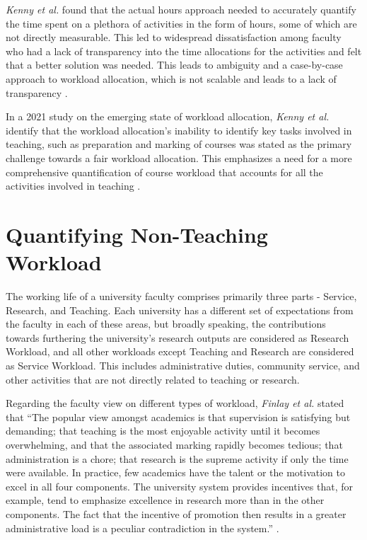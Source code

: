 \textit{Kenny et al.} found that the actual hours approach needed to accurately quantify the time spent on a plethora of activities in the form of hours, some of which are not directly measurable. This led to widespread dissatisfaction among faculty who had a lack of transparency into the time allocations for the activities and felt that a better solution was needed. This leads to ambiguity and a case-by-case approach to workload allocation, which is not scalable and leads to a lack of transparency \cite{kenny2014effectiveness}.

In a 2021 study on the emerging state of workload allocation, \textit{Kenny et al.} identify that the workload allocation's inability to identify key tasks involved in teaching, such as preparation and marking of courses was stated as the primary challenge towards a fair workload allocation. This emphasizes a need for a more comprehensive quantification of course workload that accounts for all the activities involved in teaching \cite{kenny2021emerging}.

\section{Quantifying Non-Teaching Workload}

The working life of a university faculty comprises primarily three parts - Service, Research, and Teaching. Each university has a different set of expectations from the faculty in each of these areas, but broadly speaking, the contributions towards furthering the university's research outputs are considered as Research Workload, and all other workloads except Teaching and Research are considered as Service Workload. This includes administrative duties, community service, and other activities that are not directly related to teaching or research.

Regarding the faculty view on different types of workload, \textit{Finlay et al.} stated that ``The popular view amongst academics is that supervision is satisfying but demanding; that
teaching is the most enjoyable activity until it becomes overwhelming, and that the associated marking rapidly becomes tedious; that administration is a chore; that research is the supreme activity if only the time were available. In practice, few academics have the talent or the motivation to excel in all four components. The university system provides incentives that, for example, tend to emphasize excellence in research more than in the other components. The fact that the incentive of promotion then results in a greater administrative load is a peculiar contradiction in the system.'' \cite{finlay1994management}.

